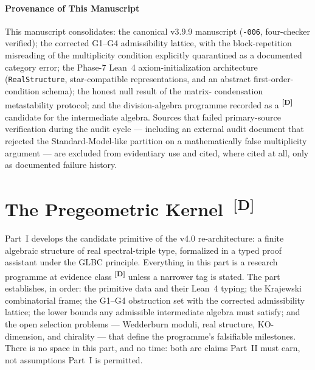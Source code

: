 \documentclass[12pt,a4paper,twoside]{article}
\theoremstyle{plain}
\theoremstyle{definition}
\theoremstyle{remark}
\newcommand{\catmark}[1]{\textsuperscript{\textsf{\textbf{[#1]}}}}
\begin{document}
\subsection{Provenance of This Manuscript}
\label{subsec:provenance}

This manuscript consolidates: the canonical v3.9.9 manuscript
(\texttt{-006}, four-checker verified); the corrected G1--G4
admissibility lattice, with the block-repetition misreading of the
multiplicity condition explicitly quarantined as a documented category
error; the Phase-7 Lean~4 axiom-initialization architecture
(\texttt{RealStructure}, star-compatible representations, and an abstract
first-order-condition schema); the honest null result of the matrix-%
condensation metastability protocol; and the division-algebra programme
recorded as a \catmark{D} candidate for the intermediate algebra. Sources
that failed primary-source verification during the audit cycle ---
including an external audit document that rejected the
Standard-Model-like partition on a mathematically false multiplicity
argument --- are excluded from evidentiary use and cited, where cited at
all, only as documented failure history.

\newpage
\part{The Pregeometric Kernel\texorpdfstring{\ \catmark{D}}{[D]}}
\label{part:pregeometric-kernel}

\noindent Part~I develops the candidate primitive of the v4.0
re-architecture: a finite algebraic structure of real spectral-triple type,
formalized in a typed proof assistant under the GLBC principle. Everything
in this part is a research programme at evidence class \catmark{D} unless
a narrower tag is stated. The part establishes, in order: the primitive
data and their Lean~4 typing; the Krajewski combinatorial frame; the
G1--G4 obstruction set with the corrected admissibility lattice; the lower
bounds any admissible intermediate algebra must satisfy; and the open
selection problems --- Wedderburn moduli, real structure, KO-dimension,
and chirality --- that define the programme's falsifiable milestones.
There is no space in this part, and no time: both are claims Part~II must
earn, not assumptions Part~I is permitted.
\end{document}
